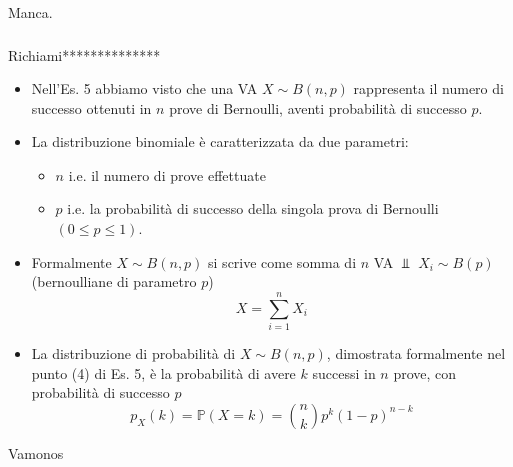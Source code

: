 Manca.
\subsubsection{}

Richiami**************
\begin{itemize}
\item Nell'Es. 5 abbiamo visto che una VA $X\sim B( n,p)$ rappresenta il numero di successo ottenuti in $n$ prove di Bernoulli, aventi probabilità di successo $p$.
\item La distribuzione binomiale è caratterizzata da due parametri:
\begin{itemize}
\item $n$ i.e. il numero di prove effettuate
\item $p$ i.e. la probabilità di successo della singola prova di Bernoulli $( 0\leq p\leq 1)$.
\end{itemize}
\item Formalmente $X\sim B( n,p)$ si scrive come somma di $n$ VA $\Bot $ $X_{i} \sim B( p)$ (bernoulliane di parametro $p$)\begin{equation*}
X=\sum\limits _{i=1}^{n} X_{i}
\end{equation*}
\item La distribuzione di probabilità di $X\sim B( n,p)$, dimostrata formalmente nel punto (4) di Es. 5, è la probabilità di avere $k$ successi in $n$ prove, con probabilità di successo $p$\begin{equation*}
\boxed{p_{X}( k) =\mathbb{P}( X=k) =\binom{n}{k} p^{k}( 1-p)^{n-k}}
\end{equation*}
\end{itemize}

Vamonos


